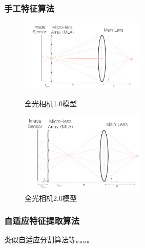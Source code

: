 \documentclass[UTF8,a4paper,11pt]{ctexart}
\begin{document}
\begin{sloppypar}
	\subsubsection{手工特征算法}
	
	
	\begin{figure}[htbp]
		\centering
		\begin{minipage}[t]{0.48\textwidth}
			\centering
			\includegraphics[width=6cm]{./image/plenoptic1.0.png}
			\caption{全光相机1.0模型}
			\label{fig:label}
		\end{minipage}
		\begin{minipage}[t]{0.48\textwidth}
			\centering
			\includegraphics[width=6cm]{./image/plenoptic2.0.png}
			\caption{全光相机2.0模型}
			\label{fig:label}
		\end{minipage}
	\end{figure}
	
	
	
	\subsubsection{自适应特征提取算法}
	类似自适应分割算法等\cite{wang2020deep,thelightfield}。。。。
	

\end{sloppypar}
\end{document}
